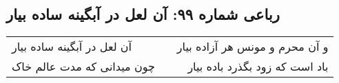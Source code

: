 \begin{center}
\section*{رباعی شماره ۹۹: آن لعل در آبگینه ساده بیار}
\label{sec:sh099}
\begin{longtable}{l p{0.5cm} r}
آن لعل در آبگینه ساده بیار
&&
و آن محرم و مونس هر آزاده بیار
\\
چون میدانی که مدت عالم خاک
&&
باد است که زود بگذرد باده بیار
\\
\end{longtable}
\end{center}
